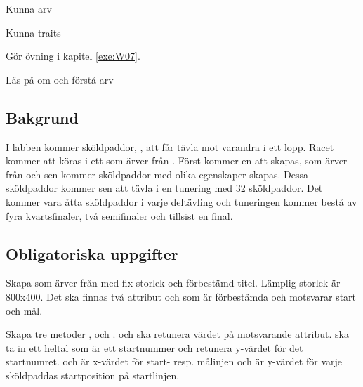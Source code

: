 

\Teamlab{\LabWeekSEVEN}

\begin{Goals}
\item Kunna arv
\item Kunna traits
\end{Goals}

\begin{Preparations}
\item Gör övning {\tt \ExeWeekSEVEN} i kapitel \ref{exe:W07}.
\item Läs på om och förstå arv

\end{Preparations}

\subsection{Bakgrund}
I labben kommer sköldpaddor, , att får tävla mot varandra i ett lopp. Racet kommer att köras i ett  som ärver från . Först kommer en  att skapas, som ärver från  och sen kommer sköldpaddor med olika egenskaper skapas. Dessa sköldpaddor kommer sen att tävla i en tunering med 32 sköldpaddor. Det kommer vara åtta sköldpaddor i varje deltävling och tuneringen kommer bestå av fyra kvartsfinaler, två semifinaler och tillsist en final.

\subsection{Obligatoriska uppgifter}

\Task {}

\Subtask Skapa  som ärver från  med fix storlek och förbestämd titel. Lämplig storlek är 800x400. Det ska finnas två attribut  och  som är förbestämda och motsvarar start och mål.

\Subtask Skapa tre metoder ,  och .  och  ska retunera värdet på motsvarande attribut.  ska ta in ett heltal  som är ett startnummer och retunera y-värdet för det startnumret.  och  är x-värdet för start- resp. målinjen och  är y-värdet för varje sköldpaddas startposition på startlinjen.

